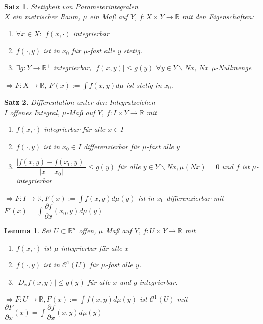 \documentclass[11pt]{memoir}
\theoremstyle{changebreak}
\newtheorem{Lemma}{Lemma}[chapter]
\newtheorem{Satz}{Satz}[chapter]
\begin{document}
\begin{Satz}
\emph{Stetigkeit von Parameterintegralen} \\
$X$ ein metrischer Raum, $\mu$ ein Maß auf $Y$, $f: X \times Y \rightarrow \mathbb R$ mit den Eigenschaften:
\begin{enumerate}
	\item $\forall x \in X:$ $f(x, \cdotp)$ integrierbar
	\item $f(\cdotp, y)$ ist in $x_0$ für $\mu$-fast alle $y$ stetig.
	\item $\exists g: Y \rightarrow \mathbb R^+$ integrierbar, $|f(x, y)| \leq g(y)$ $\forall y \in Y \backslash Nx$, $Nx$ $\mu$-Nullmenge
\end{enumerate}
$\Rightarrow F: X \rightarrow \mathbb R$, $F(x):= \int f(x, y) d\mu$ ist stetig in $x_0$.
\end{Satz}

\begin{Satz}
\emph{Differentation unter den Integralzeichen} \\
$I$ offenes Integral, $\mu$-Maß auf $Y$, $f: I \times Y \rightarrow \mathbb R$ mit
\begin{enumerate}
	\item $f(x, \cdotp)$ integrierbar für alle $x \in I$
	\item $f(\cdotp, y)$ ist in $x_0 \in I$ differenzierbar für $\mu$-fast alle $y$
	\item $\dfrac{|f(x, y) - f(x_0, y)|}{|x - x_0|} \leq g(y)$ für alle $y \in Y \backslash Nx, \mu(Nx)= 0$ und $f$ ist $\mu$-integrierbar \\
\end{enumerate}
$\Rightarrow F: I \rightarrow \mathbb R, F(x):= \int f(x, y)d\mu(y)$ ist in $x_0$ differenzierbar mit $ F'(x) = \int \dfrac{\partial f}{\partial x}(x_0, y) d\mu(y)$

\end{Satz}

\begin{Lemma}
Sei $U \subset \mathbb R^n$ offen, $\mu$ Maß auf $Y$, $f: U \times Y \rightarrow \mathbb R$ mit
\begin{enumerate}
	\item $f(x, \cdotp)$ ist $\mu$-integrierbar für alle $x$
	\item $f(\cdotp, y)$ ist in $\mathscr C^1(U)$ für $\mu$-fast alle $y$.
	\item $|D_x f(x, y)| \leq g(y)$ für alle $x$ und $g$ integrierbar.
\end{enumerate}
$\Rightarrow F: U \rightarrow \mathbb R, F(x):= \int f(x, y) d\mu(y)$ ist $\mathscr C^1(U)$ mit $\dfrac{\partial F}{\partial x}(x) = \int \dfrac{\partial f}{\partial x}(x, y) d\mu(y)$
\end{Lemma}
\end{document}
